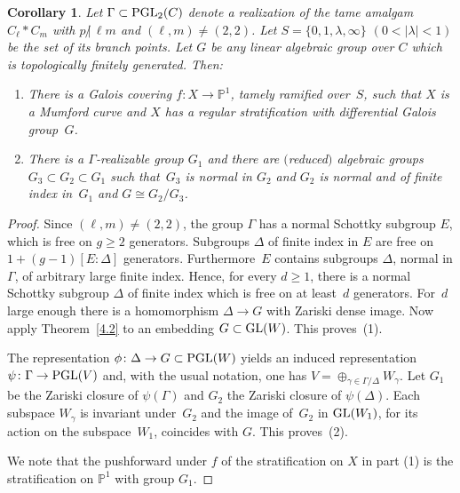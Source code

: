 \documentclass[10pt,a4paper]{amsart}
\numberwithin{equation}{section}
\newtheorem{Corollary}[Theorem]{Corollary}
\begin{document}
\begin{Corollary}\label{5.5} Let $\Gamma\subset {\rm PGL}_2(C)$ denote a realization of the tame amalgam $C_\ell\ast C_m$ with $p\, {\not |}\, \ell m$ and $(\ell,m)\neq (2,2)$. Let $S=\{0,1,\lambda ,\infty\}$ $(0<|\lambda |<1)$ be the set of its branch points. Let $G$ be any linear algebraic group over $C$ which is topologically finitely generated. Then:
\begin{enumerate}\itemsep=0pt
\item[$(1)$] There is a Galois covering $f\colon X\rightarrow \mathbb{P}^1$, tamely ramified over~$S$, such that $X$ is a Mumford curve and $X$ has a regular stratification with differential Galois group~$G$.
\item[$(2)$] There is a $\Gamma$-realizable group $G_1$ and there are $($reduced$)$ algebraic groups $G_3\subset G_2\subset G_1$ such that~$G_3$ is normal in $G_2$ and $G_2$ is normal and of finite index in~$G_1$ and $G\cong G_2/G_3$.
\end{enumerate}
 \end{Corollary}

 \begin{proof} Since $(\ell ,m)\neq (2,2)$, the group $\Gamma$ has a normal Schottky subgroup $E$, which is free on $g\geq 2$ generators. Subgroups $\Delta$ of finite index in $E$ are free on $1+(g-1)[E:\Delta]$ generators. Furthermore~$E$ contains subgroups $\Delta$, normal in $\Gamma$, of arbitrary large finite index. Hence, for every $d\geq 1$, there is a normal Schottky subgroup $\Delta$ of finite index which is free on at least~$d$ generators. For~$d$ large enough there is a homomorphism $\Delta \rightarrow G$ with Zariski dense image. Now apply Theorem~\ref{4.2} to an embedding $G\subset {\rm GL}(W)$. This proves~(1).

 The representation $\phi\colon \Delta \rightarrow G\subset {\rm PGL}(W)$ yields an induced representation $\psi\colon \Gamma \rightarrow {\rm PGL}(V)$ and, with the usual notation, one has $V=\oplus _{\gamma \in \Gamma /\Delta}W_\gamma$. Let $G_1$ be the Zariski closure of $\psi (\Gamma)$ and $G_2$ the Zariski closure of $\psi(\Delta)$. Each subspace $W_\gamma$ is invariant under~$G_2$ and the image of~$G_2$ in ${\rm GL}(W_1)$, for its action on the subspace~$W_1$, coincides with $G$. This proves~(2).

 We note that the pushforward under $f$ of the stratification on $X$ in part (1) is the stratification on $\mathbb{P}^1$ with group $G_1$.
 \end{proof}
\end{document}
